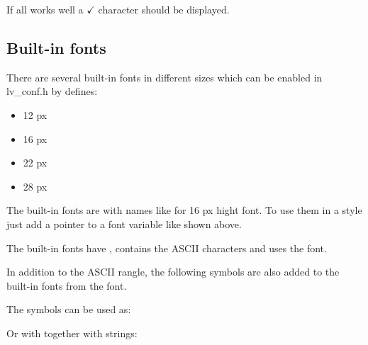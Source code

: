 \documentclass[letterpaper,10pt,english]{sphinxmanual}
\begin{document}
If all works well a \(\checkmark\) character should be displayed.


\subsection{Built-in fonts}
\label{\detokenize{overview/fonts:built-in-fonts}}
There are several built-in fonts in different sizes which can be enabled in lv\_conf.h by  defines:
\begin{itemize}
\item {} 
 12 px

\item {} 
 16 px

\item {} 
 22 px

\item {} 
 28 px

\end{itemize}

The built-in fonts are  with names like  for 16 px hight font. To use them in a style just add a pointer to a font variable like shown above.

The built-in fonts have , contains the ASCII characters and uses the  font.

In addition to the ASCII rangle, the following symbols are also added to the built-in fonts from the  font.


The symbols can be used as:

\begin{sphinxVerbatim}[commandchars=\\\{\}]
 
\end{sphinxVerbatim}

Or with together with strings:

\begin{sphinxVerbatim}[commandchars=\\\{\}]
  
\end{sphinxVerbatim}
\end{document}
